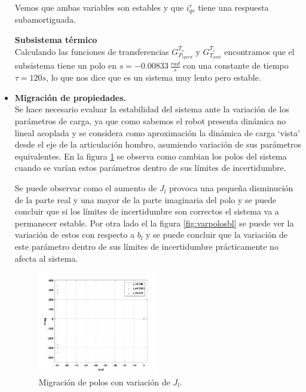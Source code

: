 \documentclass[10pt]{article}
\begin{document}
\begin{itemize}
Vemos que ambas variables son estables y que $i^{r}_{qs}$ tiene una respuesta subamortiguada.

\vspace{0.2cm}
\subitem \textbf{Subsistema térmico}\vspace{0.2cm} \\
Calculando las funciones de transferencias  $G^{T_{s}}_{P_{s perd}}$ y $G^{T_{s}}_{T_{amb}}$ encontramos que el subsistema tiene un polo en $s=-0.00833\ \frac{rad}{s}$ con una constante de tiempo $\tau=120 s$, lo que nos dice que es un sistema muy lento pero estable.
\newpage
\item \textbf{Migración de propiedades.}\vspace{0.2cm}\\
Se hace necesario evaluar la estabilidad del sistema ante la variación de los parámetros de carga, ya que como sabemos el robot presenta dinámica no lineal acoplada y se considera como aproximación la dinámica de carga `vista' desde el eje de la articulación hombro, asumiendo variación de sus parámetros equivalentes. En la figura \ref{fig:varpolos} se observa como cambian los polos del sistema cuando se varían estos parámetros dentro de sus límites de incertidumbre.

	Se puede observar como el aumento de $J_{l}$ provoca una pequeña disminución de la parte real y una mayor de la parte imaginaria del polo y se puede concluir que si los límites de incertidumbre son correctos el sistema va a permanecer estable. Por otra lado el la figura \ref{fig:varpolosbl} se puede ver la variación de estos con respecto a $b_{l}$ y se puede concluir que la variación de este parámetro dentro de sus límites de incertidumbre prácticamente no afecta al sistema.
	
	\begin{figure}[h!]
	\centering
	\includegraphics[width=0.5\textwidth]{varpolos.png}
	\caption{\label{fig:varpolos} Migración de polos con variación de $J_{l}$.}
	\end{figure}
	

\end{itemize}
\end{document}

